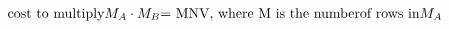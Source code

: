 \documentclass[preview]{standalone}
\begin{document}
\begin{align*}
\text{cost to multiply} M_{A} \cdot M_{B} \text{= MNV, where M is the number \newline of rows in} M_{A}
\end{align*}
\end{document}
